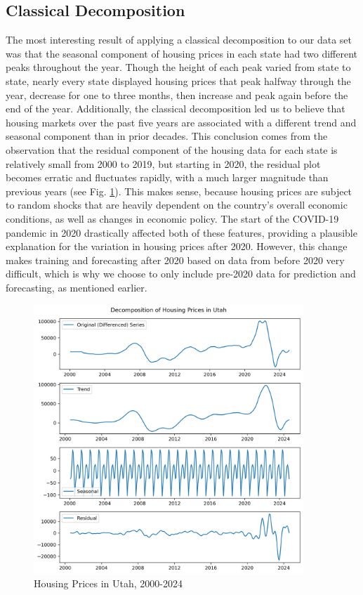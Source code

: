 \documentclass[11pt]{amsart}
\begin{document}
\subsection{Classical Decomposition}
The most interesting result of applying a classical decomposition to our data set was that the seasonal component of housing prices in each state had two different peaks throughout the year.
Though the height of each peak varied from state to state, nearly every state displayed housing prices that peak halfway through the year, decrease for one to three months, then increase and peak again before the end of the year.
Additionally, the classical decomposition led us to believe that housing markets over the past five years are associated with a different trend and seasonal component than in prior decades.
This conclusion comes from the observation that the residual component of the housing data for each state is relatively small %
from 2000 to 2019, but starting in 2020, the residual plot becomes erratic and fluctuates rapidly, with a much larger magnitude than previous years (see Fig. \ref{fig:utah deomposition}).
This makes sense, because housing prices are subject to random shocks that are heavily dependent on the country's overall economic conditions, as well as changes in economic policy.
The start of the COVID-19 pandemic in 2020 drastically affected both of these features, providing a plausible explanation for the variation in housing prices after 2020.
However, this change makes training and forecasting after 2020 based on data from before 2020 very difficult, which is why we choose to only include pre-2020 data for prediction and forecasting, as mentioned earlier.

\begin{figure}[htbp]
    \centering
        \centering
        \includegraphics[width=4in]{figures/utah_prices.png}
        \caption{Housing Prices in Utah, 2000-2024}
        \label{fig:utah deomposition}

\end{figure}
\end{document}
